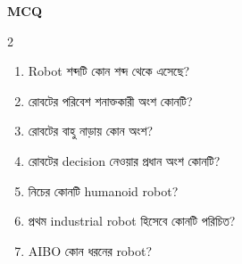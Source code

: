\begin{practicebox}
\textbf{MCQ}
\begin{multicols}{2}\begin{enumerate}
\item \begin{minipage}[t]{\linewidth}Robot শব্দটি কোন শব্দ থেকে এসেছে?\par {}\par\end{minipage}

\item \begin{minipage}[t]{\linewidth}রোবটের পরিবেশ শনাক্তকারী অংশ কোনটি?\par {}\par\end{minipage}

\item \begin{minipage}[t]{\linewidth}রোবটের বাহু নাড়ায় কোন অংশ?\par {}\par\end{minipage}

\item \begin{minipage}[t]{\linewidth}রোবটের decision নেওয়ার প্রধান অংশ কোনটি?\par {}\par\end{minipage}

\item \begin{minipage}[t]{\linewidth}নিচের কোনটি humanoid robot?\par {}\par\end{minipage}

\item \begin{minipage}[t]{\linewidth}প্রথম industrial robot হিসেবে কোনটি পরিচিত?\par {}\par\end{minipage}

\item \begin{minipage}[t]{\linewidth}AIBO কোন ধরনের robot?\par {}\par\end{minipage}


\end{enumerate}
\end{multicols}
\end{practicebox}
